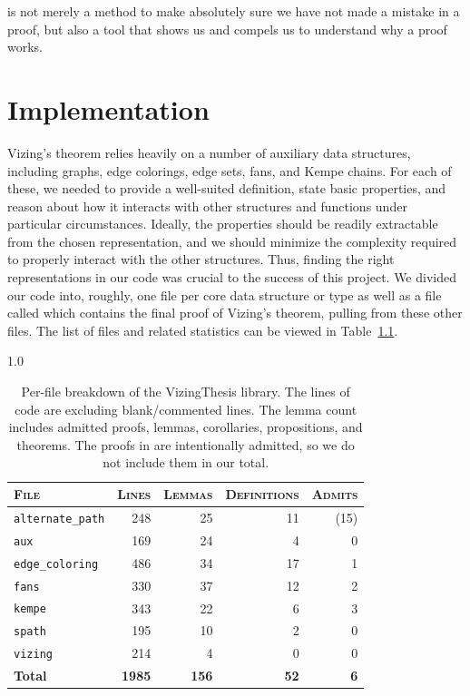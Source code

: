 \begin{savequote} is not merely a method to make absolutely sure we have not made a mistake in a proof, but also a tool that shows us and compels us to understand why a proof works.
\end{savequote}

\chapter{Implementation}\label{chapter implement}
Vizing's theorem relies heavily on a number of auxiliary data structures, including graphs, edge colorings, edge sets, fans, and Kempe chains. For each of these, we needed to provide a well-suited definition, state basic properties, and reason about how it interacts with other structures and functions under particular circumstances. Ideally, the properties should be readily extractable from the chosen representation, and we should minimize the complexity required to properly interact with the other structures. Thus, finding the right representations in our code was crucial to the success of this project. We divided our code into, roughly, one file per core data structure or type as well as a file called  which contains the final proof of Vizing's theorem, pulling from these other files. The list of files and related statistics can be viewed in Table~\ref{tab:stats}.
\begin{table}[htbp]
  \centering
    \begin{spacing}{1.0}
    \sffamily
    \begin{tabular}{lrrrr}
    \hline
    \textsc{File} & \textsc{Lines} & \textsc{Lemmas} & \textsc{Definitions} & \textsc{Admits} \\
    \hline\hline
    \texttt{alternate\_path} & 248 & 25 & 11 & (15) \\
    \texttt{aux} & 169 & 24 & 4 & 0 \\
    \texttt{edge\_coloring} & 486 & 34 & 17 & 1 \\
    \texttt{fans} & 330 & 37 & 12 & 2 \\
    \texttt{kempe} & 343 & 22 & 6 & 3 \\
    \texttt{spath} & 195 & 10 & 2 & 0 \\
    \texttt{vizing} & 214 & 4 & 0 & 0 \\
    \hline
    \textbf{Total} & \textbf{1985} & \textbf{156} & \textbf{52} & \textbf{6} \\
    \hline
  \end{tabular}
  \end{spacing}
  \caption{Per-file breakdown of the VizingThesis library. The lines of code are excluding blank/commented lines. The lemma count includes admitted proofs, lemmas, corollaries, propositions, and theorems. The proofs in  are intentionally admitted, so we do not include them in our total.}
  \label{tab:stats}
\end{table}
